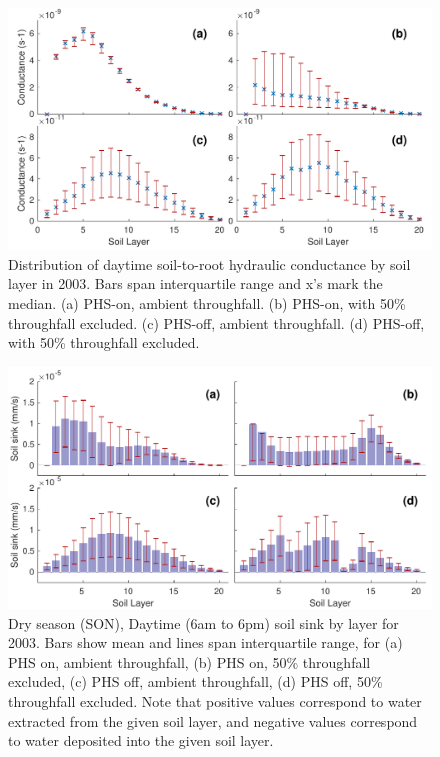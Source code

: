 \documentclass[draft,linenumbers]{agujournal}
\begin{document}
  
\clearpage   
  \begin{figure}[h]
     \centering
     \includegraphics[width=30pc]{../figs/fig6.pdf}
     \caption{Distribution of daytime soil-to-root hydraulic conductance by soil layer in 2003. Bars span interquartile range and x's mark the median. 
     (a) PHS-on, ambient throughfall.
     (b) PHS-on, with 50\% throughfall excluded.
     (c) PHS-off, ambient throughfall.
     (d) PHS-off, with 50\% throughfall excluded.
     }
     \label{fig:cond}
  \end{figure}

  
        \clearpage
    \begin{figure}[h]
     \centering
     \includegraphics[width=30pc]{../figs/fig7.pdf}
     \caption{Dry season (SON), Daytime (6am to 6pm) soil sink by layer for 2003. 
     Bars show mean and lines span interquartile range, for 
     (a) PHS on, ambient throughfall,
     (b) PHS on, 50\% throughfall excluded,
     (c) PHS off, ambient throughfall,
     (d) PHS off, 50\% throughfall excluded. 
     Note that positive values correspond to water extracted from the given soil layer, 
     and negative values correspond to water deposited into the given soil layer.}
     \label{fig7}
  \end{figure}
  
\end{document}
